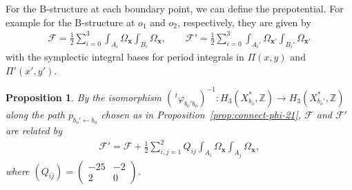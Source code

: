 \documentclass[pdftex]{sigma}
\numberwithin{equation}{section}
\newtheorem{Proposition}[Theorem]{Proposition}
\begin{document}
For the B-structure at each boundary point, we can define the prepotential. For example for the B-structure at $o_{1}$ and $o_{2}$, respectively,
they are given by
\begin{gather*}
\mathcal{F}=\frac{1}{2}\sum_{i=0}^{3}\int_{A_{i}}\Omega_{\bm{x}}\int_{B_{i}}\Omega_{\bm{x}},\qquad \mathcal{F}'=\frac{1}{2}\sum_{i=0}^{3}\int_{A_{i}'}\Omega_{\bm{x}'}\int_{B_{i}'}\Omega_{\bm{x}'}
\end{gather*}
with the symplectic integral bases for period integrals in $\Pi(x,y)$ and $\Pi'(x',y')$.
\begin{Proposition}\label{prop:prepot-F}By the isomorphism $(\,^{t}\varphi_{b_{o}'b_{o}})^{-1}\colon H_{3}(X_{b_{o}}^{*},\mathbb{Z})\to H_{3}(X_{b_{o}'}^{*},\mathbb{Z})$ along the path $p_{b_{o}'\leftarrow b_{o}}$ chosen as in Proposition~{\rm \ref{prop:connect-phi-21}}, $\mathcal{F}$ and $\mathcal{F}'$ are related by
\begin{gather*}
\mathcal{F}'=\mathcal{F}+\frac{1}{2}\sum_{i,j=1}^{2}Q_{ij}\int_{A_{i}}\Omega_{\bm{x}}\int_{A_{j}}\Omega_{\bm{x}},
\end{gather*}
where $(Q_{ij})=\left(\begin{smallmatrix}-25 & -2\\
2 & 0
\end{smallmatrix}\right)$.\end{Proposition}
\end{document}
